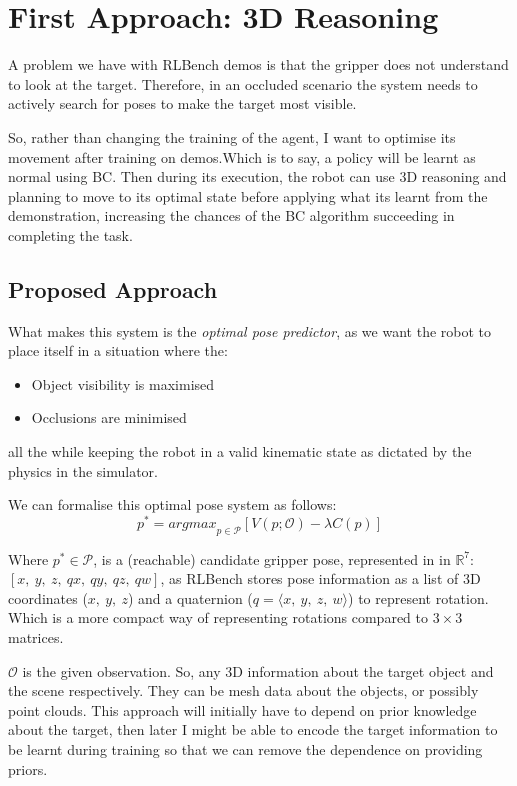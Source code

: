 \section{First Approach: 3D Reasoning}\label{sec:appl-1}
A problem we have with RLBench demos is that the gripper does not understand to look at the target. Therefore, in an occluded scenario the system needs to actively search for poses to make the target most visible.

So, rather than changing the training of the agent, I want to optimise its movement after training on demos.Which is to say, a policy will be learnt as normal using BC. Then during its execution, the robot can use 3D reasoning and  planning to move to its optimal state before applying what its learnt from the demonstration, increasing the chances of the BC algorithm succeeding in completing the task.

\subsection{Proposed Approach}\label{subsec:appl-first-proposed}
What makes this system is the \emph{optimal pose predictor}, as we want the robot to place itself in a situation where the:
\begin{itemize}
  \item Object visibility is maximised
  \item Occlusions are minimised
\end{itemize}
all the while keeping the robot in a valid kinematic state as dictated by the physics in the simulator.

We can formalise this optimal pose system as follows:
\[
p^* = {argmax}_{p \in \mathcal{P}}
  \left[
    V \left( p; \mathcal{O} \right)
    - 
    \lambda C\left( p \right)
  \right]
\]

Where \(p^* \in \mathcal{P}\), is a (reachable) candidate gripper pose, represented in in \(\mathbb{R}^7\): \( \left[ x, ~y, ~z, ~qx, ~qy, ~qz, ~qw\right]\), as RLBench stores pose information as a list of 3D coordinates (\(x, ~y, ~z\)) and a quaternion (\(q = \langle x, ~y, ~z, ~w \rangle \)) to represent rotation. Which is a more compact way of representing rotations compared to $3\times3$ matrices.

$\mathcal{O}$ is the given observation. So, any  3D information about the target object and the scene respectively. They can be mesh data about the objects, or possibly point clouds. This approach will initially have to depend on prior knowledge about the target, then later I might be able to encode the target information to be learnt during training so that we can remove the dependence on providing priors.

